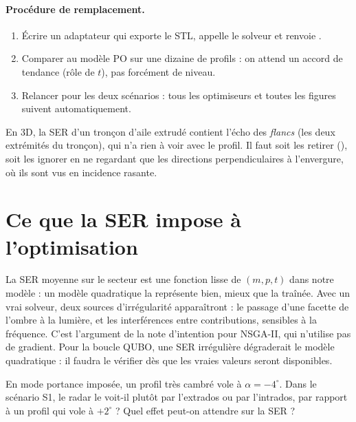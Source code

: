 \paragraph{Procédure de remplacement.}
\begin{enumerate}
\item Écrire un adaptateur  qui exporte le STL, appelle le solveur et renvoie .
\item Comparer au modèle PO sur une dizaine de profils : on attend un accord de tendance (rôle de $t$), pas forcément de niveau.
\item Relancer  pour les deux scénarios : tous les optimiseurs et toutes les figures suivent automatiquement.
\end{enumerate}

\begin{piege}
En 3D, la SER d'un tronçon d'aile extrudé contient l'écho des \emph{flancs} (les deux extrémités du tronçon), qui n'a rien à voir avec le profil. Il faut soit les retirer (), soit les ignorer en ne regardant que les directions perpendiculaires à l'envergure, où ils sont vus en incidence rasante.
\end{piege}

\section{Ce que la SER impose à l'optimisation}
La SER moyenne sur le secteur est une fonction lisse de $(m,p,t)$ dans notre modèle : un modèle quadratique la représente bien, mieux que la traînée. Avec un vrai solveur, deux sources d'irrégularité apparaîtront : le passage d'une facette de l'ombre à la lumière, et les interférences entre contributions, sensibles à la fréquence. C'est l'argument de la note d'intention pour NSGA-II, qui n'utilise pas de gradient. Pour la boucle QUBO, une SER irrégulière dégraderait le modèle quadratique : il faudra le vérifier dès que les vraies valeurs seront disponibles.

\exercices
\begin{exercice}
En mode portance imposée, un profil très cambré vole à $\alpha=-4^\circ$. Dans le scénario S1, le radar le voit-il plutôt par l'extrados ou par l'intrados, par rapport à un profil qui vole à $+2^\circ$ ? Quel effet peut-on attendre sur la SER ?
\end{exercice}

